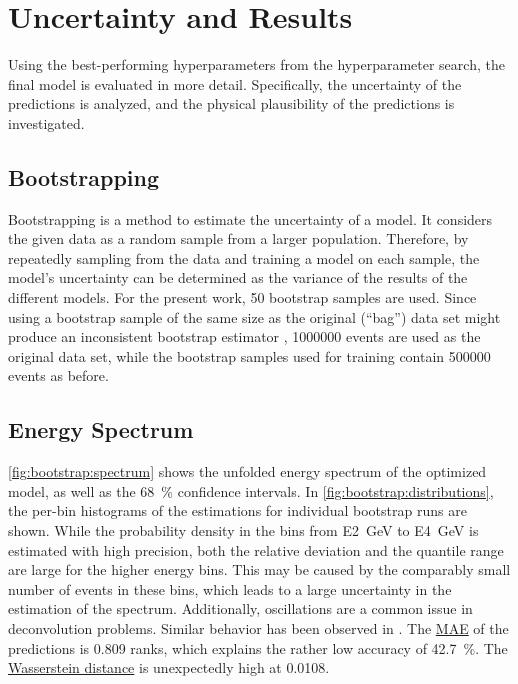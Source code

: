 \section{Uncertainty and Results}
Using the best-performing hyperparameters from the hyperparameter search, %
the final model is evaluated in more detail.
Specifically,
  the uncertainty of the predictions is analyzed, %
  and the physical plausibility of the predictions is investigated.


\subsection{Bootstrapping}
Bootstrapping \cite{bootstrap} is a method to estimate the uncertainty of a model.
It considers the given data as a random sample from a larger population.
Therefore,
by repeatedly sampling from the data and training a model on each sample,
the model's uncertainty can be determined
as the variance of the results of the different models.
%
For the present work, \num{50} bootstrap samples are used.
Since using a bootstrap sample of the same size as the original (\enquote{bag}) data set
might produce an inconsistent bootstrap estimator \cite{bootstrap_samplesize},
\num{1000000} events are used as the original data set,
while the bootstrap samples used for training contain \num{500000} events as before.


\subsection{Energy Spectrum}
\autoref{fig:bootstrap:spectrum} shows the unfolded energy spectrum of the optimized model,
as well as the \SI{68}{\percent} confidence intervals.
In \autoref{fig:bootstrap:distributions},
the per-bin histograms of the estimations for individual bootstrap runs are shown.
While the probability density in the bins from \SI{E2}{\giga\electronvolt} to \SI{E4}{\giga\electronvolt} is estimated with high precision,
both the relative deviation and the quantile range are large for the higher energy bins.
This may be caused by the comparably small number of events in these bins,
which leads to a large uncertainty in the estimation of the spectrum.
Additionally,
oscillations are a common issue in deconvolution problems.
Similar behavior has been observed in \cite{dsea_samuel}.
%
The \hyperref[sec:unfolding:metrics:mae]{\ac{MAE}} of the predictions is \num{0.809} ranks,
  which explains the rather low accuracy of \SI{42.7}{\percent}.
The \hyperref[sec:unfolding:metrics:wd]{Wasserstein distance}
is unexpectedly high at \num{0.0108}.

